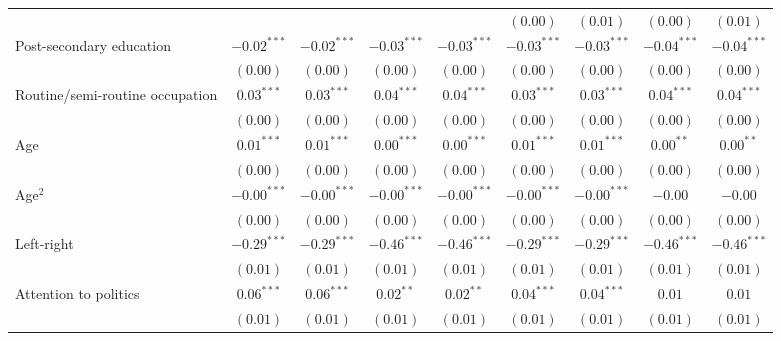 \documentclass[12pt, letter]{scrartcl}
\begin{document}
\begin{tiny}
\begin{longtable}{lcccccccc}
                                            &               &               &               &               & $(0.00)$      & $(0.01)$      & $(0.00)$      & $(0.01)$      \\
Post-secondary education                    & $-0.02^{***}$ & $-0.02^{***}$ & $-0.03^{***}$ & $-0.03^{***}$ & $-0.03^{***}$ & $-0.03^{***}$ & $-0.04^{***}$ & $-0.04^{***}$ \\
                                            & $(0.00)$      & $(0.00)$      & $(0.00)$      & $(0.00)$      & $(0.00)$      & $(0.00)$      & $(0.00)$      & $(0.00)$      \\
Routine/semi-routine occupation             & $0.03^{***}$  & $0.03^{***}$  & $0.04^{***}$  & $0.04^{***}$  & $0.03^{***}$  & $0.03^{***}$  & $0.04^{***}$  & $0.04^{***}$  \\
                                            & $(0.00)$      & $(0.00)$      & $(0.00)$      & $(0.00)$      & $(0.00)$      & $(0.00)$      & $(0.00)$      & $(0.00)$      \\
Age                                         & $0.01^{***}$  & $0.01^{***}$  & $0.00^{***}$  & $0.00^{***}$  & $0.01^{***}$  & $0.01^{***}$  & $0.00^{**}$   & $0.00^{**}$   \\
                                            & $(0.00)$      & $(0.00)$      & $(0.00)$      & $(0.00)$      & $(0.00)$      & $(0.00)$      & $(0.00)$      & $(0.00)$      \\
Age$^2$                                     & $-0.00^{***}$ & $-0.00^{***}$ & $-0.00^{***}$ & $-0.00^{***}$ & $-0.00^{***}$ & $-0.00^{***}$ & $-0.00$       & $-0.00$       \\
                                            & $(0.00)$      & $(0.00)$      & $(0.00)$      & $(0.00)$      & $(0.00)$      & $(0.00)$      & $(0.00)$      & $(0.00)$      \\
Left-right                                  & $-0.29^{***}$ & $-0.29^{***}$ & $-0.46^{***}$ & $-0.46^{***}$ & $-0.29^{***}$ & $-0.29^{***}$ & $-0.46^{***}$ & $-0.46^{***}$ \\
                                            & $(0.01)$      & $(0.01)$      & $(0.01)$      & $(0.01)$      & $(0.01)$      & $(0.01)$      & $(0.01)$      & $(0.01)$      \\
Attention to politics                       & $0.06^{***}$  & $0.06^{***}$  & $0.02^{**}$   & $0.02^{**}$   & $0.04^{***}$  & $0.04^{***}$  & $0.01$        & $0.01$        \\
                                            & $(0.01)$      & $(0.01)$      & $(0.01)$      & $(0.01)$      & $(0.01)$      & $(0.01)$      & $(0.01)$      & $(0.01)$      \\

\end{longtable}
\end{tiny}
\end{document}
